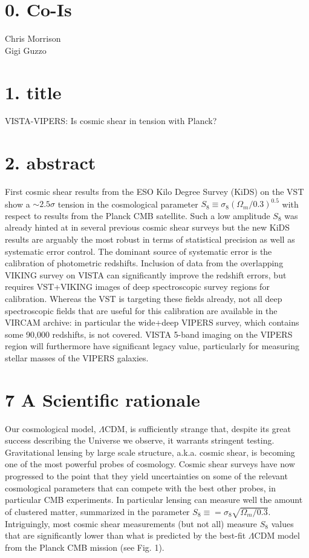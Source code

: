 \documentclass[a4paper, 10pt]{article}
\begin{document}
\section*{0. Co-Is}
Chris Morrison\\
Gigi Guzzo\\

\section*{1. title}

VISTA-VIPERS: Is cosmic shear in tension with Planck?

\section*{2. abstract}

First cosmic shear results from the ESO Kilo Degree Survey (KiDS) on the VST show a $\sim2.5\sigma$ tension in the cosmological parameter $S_8 \equiv \sigma_8 (\Omega_m/0.3)^{0.5}$ with respect to results from the Planck CMB satellite. Such a low amplitude $S_8$ was already hinted at in several previous cosmic shear surveys but the new KiDS results are arguably the most robust in terms of statistical precision as well as systematic error control. The dominant source of systematic error is the calibration of photometric redshifts. Inclusion of data from the overlapping VIKING survey on VISTA can significantly improve the redshift errors, but requires VST+VIKING images of deep spectroscopic survey regions for calibration. Whereas the VST is targeting these fields already, not all deep spectroscopic fields that are useful for this calibration are available in the VIRCAM archive: in particular the wide+deep VIPERS survey, which contains some 90,000 redshifts, is not covered. VISTA 5-band imaging on the VIPERS region will furthermore have significant legacy value, particularly for measuring stellar masses of the VIPERS galaxies.
 
\section*{7 A Scientific rationale}

Our cosmological model, $\Lambda$CDM, is sufficiently strange that, despite its great success describing the Universe we observe, it warrants stringent testing. Gravitational lensing by large scale structure, a.k.a. cosmic shear, is becoming one of the most powerful probes of cosmology. Cosmic shear surveys have now progressed to the point that they yield uncertainties on some of the relevant cosmological parameters that can compete with the best other probes, in particular CMB experiments. In particular lensing can measure well the amount of clustered matter, summarized in the parameter $S_8\equiv= \sigma_8 \sqrt{\Omega_m/0.3}$. Intriguingly, most cosmic shear measurements (but not all) measure $S_8$ values that are significantly lower than what is predicted by the best-fit $\Lambda$CDM model from the Planck CMB mission (see Fig. 1).
\end{document}
